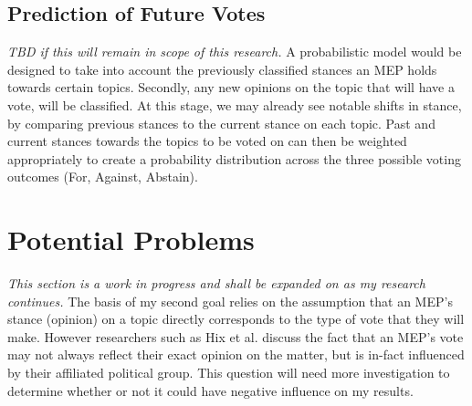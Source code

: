 \documentclass{article}
\begin{document}
\subsection{Prediction of Future Votes} \label{methodPrediction}
\textit{TBD if this will remain in scope of this research.}
\newline
\newline
A probabilistic model would be designed to take into account the previously classified stances an MEP holds towards certain topics. Secondly, any new opinions on the topic that will 
have a vote, will be classified. At this stage, we may already see notable shifts in stance, by comparing previous stances to the current stance on each topic. Past and current 
stances towards the topics to be voted on can then be weighted appropriately to create a probability distribution across the three possible voting outcomes (For, Against, Abstain). 

\section{Potential Problems}
\textit{This section is a work in progress and shall be expanded on as my research continues.}
\newline
\newline
The basis of my second goal relies on the assumption that an MEP's stance (opinion) on a topic directly corresponds to the type of vote that they will make. However researchers such 
as Hix et al. \cite{Hix2009VotingPA} discuss the fact that an MEP's vote may not always reflect their exact opinion on the matter, but is in-fact influenced by their affiliated 
political group. This question will need more investigation to determine whether or not it could have negative influence on my results.
\end{document}
